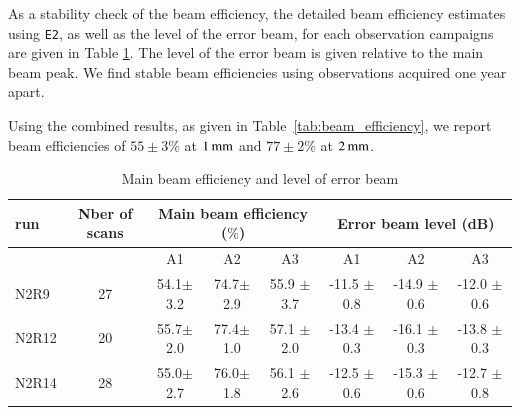 As a stability check of the beam efficiency, the detailed beam
efficiency estimates using {\tt E2}, as well as the level of
the error beam, for each observation campaigns are given in Table
\ref{tab:MB}. The level of the error beam is given relative to the
main beam peak.%
We find stable beam efficiencies using observations acquired one year apart.


Using the combined results, as given in
Table~\ref{tab:beam_efficiency}, we report beam efficiencies of
$55 \pm 3 \%$ at $1\,\rm{mm}$ and  $77 \pm 2 \%$ at $2\,\rm{mm}$. 




\begin{table}[!h]
\caption{Main beam efficiency and level of error beam}
\label{tab:MB}
\centering
\begin{tabular}{l| c | c c c | c c c}
\hline\hline
run  & Nber of scans & \multicolumn{3}{|c|}{Main beam efficiency ($\%$)} & \multicolumn{3}{c}{Error beam level (dB)} \\
\hline
     &               &  A1    &    A2   &  A3    & A1  &  A2  & A3   \\
            \hline
N2R9    & 27  &  54.1$\pm$ 3.2   &  74.7$\pm$ 2.9  & 55.9 $\pm$ 3.7   &  -11.5 $\pm$ 0.8    &  -14.9 $\pm$ 0.6   &  -12.0 $\pm$ 0.6   \\
N2R12   & 20  &  55.7$\pm$ 2.0   &  77.4$\pm$ 1.0  & 57.1 $\pm$ 2.0   &  -13.4 $\pm$ 0.3    &  -16.1 $\pm$ 0.3   &  -13.8 $\pm$ 0.3   \\
N2R14   & 28  &  55.0$\pm$ 2.7   &  76.0$\pm$ 1.8  & 56.1 $\pm$ 2.6   &  -12.5 $\pm$ 0.6    &  -15.3 $\pm$ 0.6   &  -12.7 $\pm$ 0.8   \\
            \hline\hline
\end{tabular}
\end{table}

